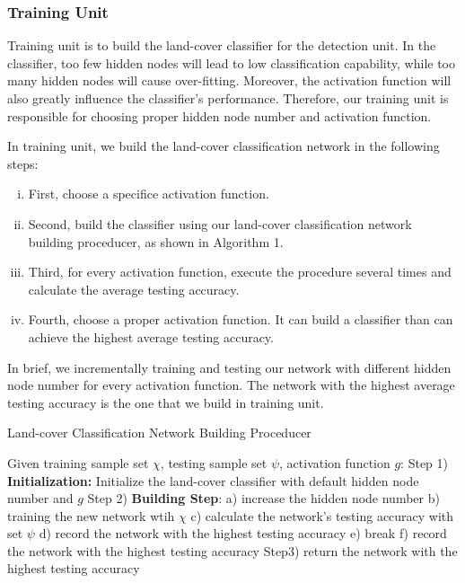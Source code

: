 \documentclass{elsart}
\begin{document}
\subsubsection{Training Unit}
Training unit is to build the land-cover classifier for the detection unit.
In the classifier, too few hidden nodes will lead to low classification capability, while too many hidden nodes will cause over-fitting. 
Moreover, the activation function will also greatly influence the classifier's performance.
Therefore, our training unit is responsible for choosing proper hidden node number and activation function.
\par
In training unit, we build the land-cover classification network in the following steps:
\begin{enumerate}[(i)]
\item First, choose a specifice activation function.
\item Second, build the classifier using our land-cover classification network building proceducer, as shown in Algorithm 1.
\item Third, for every activation function, execute the procedure several times and calculate the average testing accuracy.
\item Fourth, choose a proper activation function. It can build a classifier than can achieve the highest average testing accuracy.
\end{enumerate}
\par
In brief, we incrementally training and testing our network with different hidden node number for every activation function. 
The network with the highest average testing accuracy is the one that we build in training unit.
\par
\begin{algorithm}[H]
\caption{Land-cover Classification Network Building Proceducer}
\label{alg1}
\begin{algorithmic}
\REQUIRE Given training sample set $\chi$, testing sample set $\psi$, activation function $g$: 
\STATE Step 1) \textbf{Initialization:} Initialize the land-cover classifier with default hidden node number and $g$
\STATE Step 2) \textbf{Building Step}:
	\STATE a) increase the hidden node number 
   	\STATE b) training the new network wtih $\chi$
	\STATE c) calculate the network's testing accuracy with set $\psi$
	\STATE d) record the network with the highest testing accuracy
	\STATE e) break 
	\ENDIF
	\STATE f) record the network with the highest testing accuracy 
	\ENDWHILE
\STATE Step3) return the network with the highest testing accuracy
\end{algorithmic}
\end{algorithm}
\par
\end{document}
